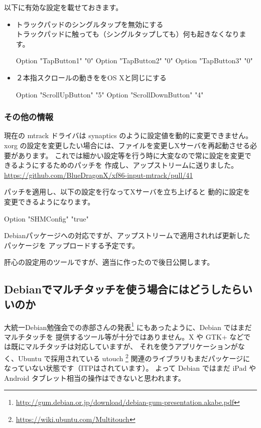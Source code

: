 \documentclass[mingoth,a4paper]{jsarticle}
\begin{document}
以下に有効な設定を載せておきます。
\begin{itemize}
\item トラックパッドのシングルタップを無効にする\\
トラックパッドに触っても（シングルタップしても）何も起きなくなります。
\begin{commandline}
Option "TapButton1" "0"
Option "TapButton2" "0"
Option "TapButton3" "0"
\end{commandline}

\item ２本指スクロールの動きををOS Xと同じにする
\begin{commandline}
Option "ScrollUpButton" "5"
Option "ScrollDownButton" "4"
\end{commandline}

\end{itemize}

\subsubsection{その他の情報}
現在の mtrack ドライバは synaptics のように設定値を動的に変更できません。
xorg の設定を変更したい場合には、ファイルを変更しXサーバを再起動させる必要があります。
これでは細かい設定等を行う時に大変なので常に設定を変更できるようにするためのパッチを
作成し、アップストリームに送りました。
\url{https://github.com/BlueDragonX/xf86-input-mtrack/pull/41}

パッチを適用し、以下の設定を行なってXサーバを立ち上げると
動的に設定を変更できるようになります。
\begin{commandline}
Option "SHMConfig" "true"
\end{commandline}
Debianパッケージへの対応ですが、アップストリームで適用されれば更新したパッケージを
アップロードする予定です。

肝心の設定用のツールですが、適当に作ったので後日公開します。

\subsection{Debianでマルチタッチを使う場合にはどうしたらいいのか}

大統一Debian勉強会での赤部さんの発表\footnote{\url{http://gum.debian.or.jp/download/debian-gum-presentation.akabe.pdf}}
にもあったように、Debian ではまだマルチタッチを
提供するツール等が十分ではありません。X や GTK+ などでは既にマルチタッチは対応していますが、
それを使うアプリケーションがなく、Ubuntu で採用されている utouch \footnote{\url{https://wiki.ubuntu.com/Multitouch}}
関連のライブラリもまだパッケージになっていない状態です（ITPはされています）。
よって Debian ではまだ iPad や Android タブレット相当の操作はできないと思われます。
\end{document}
